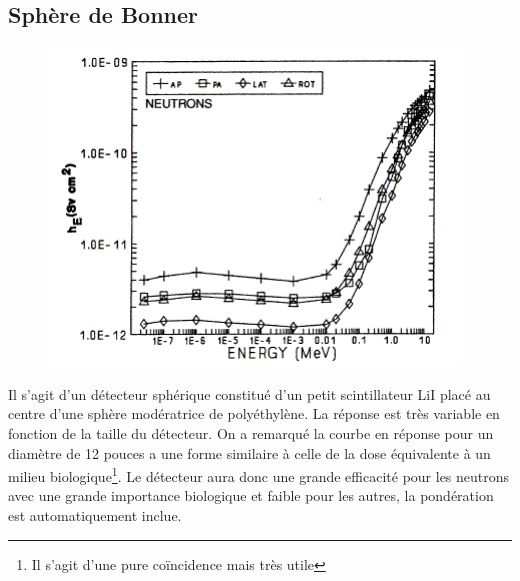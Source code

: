 \subsection{Sphère de Bonner}
	\begin{figure}
	\vspace{-5mm}
	\includegraphics[scale=0.4]{ch11/image7}
	\end{figure}
Il s'agit d'un détecteur sphérique constitué d'un petit scintillateur LiI placé au centre d'une 
sphère modératrice de polyéthylène. La réponse est très variable en fonction de la taille du 
détecteur. On a remarqué la courbe en réponse pour un diamètre de 12 pouces a une forme similaire
à celle de la dose équivalente à un milieu biologique\footnote{Il s'agit d'une pure coïncidence 
mais très utile}. Le détecteur aura donc une grande efficacité pour les neutrons avec une grande
importance biologique et faible pour les autres, la pondération est automatiquement inclue.\\


